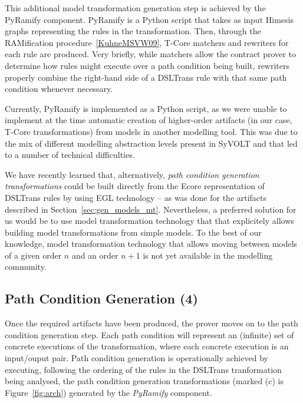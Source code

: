 This additional model transformation generation step is achieved by the PyRamify
component. PyRamify is a Python script that
takes as input Himesis graphs representing the rules in the transformation.
Then, through the RAMification procedure~\ref{KuhneMSVW09}, T-Core matchers and
rewriters for each rule are produced. Very briefly, while matchers allow the
contract prover to determine how rules might execute over a path condition being
built, rewriters properly combine the right-hand side of a DSLTrans rule with
that same path condition whenever necessary.


Currently, PyRamify is implemented as a Python script, as we were unable to
implement at the time automatic creation of higher-order artifacts (in our
case, T-Core transformations) from models in another modelling tool.
This was due to the mix of different modelling abstraction levels present in
SyVOLT and that led to a number of technical difficulties.

We have recently learned that, alternatively, \emph{path condition generation
transformations} could be built directly from the Ecore representation of
DSLTrans rules by using EGL technology -- as was done for the artifacts
described in Section~\ref{sec:gen_models_mt}. Nevertheless, a preferred solution
for us would be to use model transformation technology that that explicitely
allows building model transformations from simple models. To the best of our
knowledge, model transformation technology that allows moving between models of
a given order $n$ and an order $n+1$ is not yet available in the modelling
community.

\subsection{Path Condition Generation (4)}
\label{sec:path_cond_gen}

Once the required artifacts have been produced, the prover moves
on to the path condition generation step. Each path condition will represent an
(infinite) set of concrete executions of the transformation, where each concrete
execution is an input/ouput pair. Path condition generation is operationally
achieved by executing, following the ordering of the rules in the DSLTrans
tranformation being analysed, the path condition generation transformations
(marked (c) is Figure~\ref{fig:arch}) generated by the \emph{PyRamify}
component.

